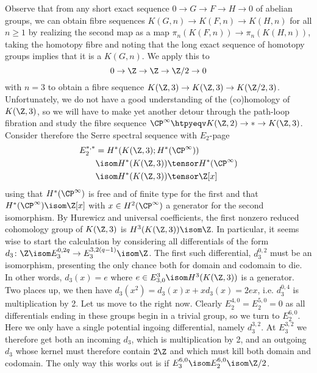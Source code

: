 \begin{solution}
	Observe that from any short exact sequence $0 \to G \to F \to H \to 0$ of abelian groups, we can obtain fibre sequences $K(G, n) \to K(F, n) \to K(H, n)$ for all $n \geq 1$ by realizing the second map as a map $\pi_n(K(F, n)) \to \pi_n(K(H, n))$, taking the homotopy fibre and noting that the long exact sequence of homotopy groups implies that it is a $K(G, n)$.
	We apply this to 
	\begin{equation*}
		0 \to \Z \to \Z \to \Zn{2} \to 0
	\end{equation*}
	with $n = 3$ to obtain a fibre sequence $K(\Z, 3) \to K(\Z, 3) \to K(\Zn{2}, 3)$.
	Unfortunately, we do not have a good understanding of the (co)homology of $K(\Z, 3)$, so we will have to make yet another detour through the path-loop fibration and study the fibre sequence $\CP^\infty \htpyeqv K(\Z, 2) \to * \to K(\Z, 3)$.
	Consider therefore the Serre spectral sequence with $E_2$-page
	\begin{align*}
		E_2^{*, *} &= H^*(K(\Z, 3); H^*(\CP^\infty)) \\ 
				   &\isom H^*(K(\Z, 3)) \tensor H^*(\CP^\infty) \\
				   &\isom H^*(K(\Z, 3)) \tensor \Z[x]
	\end{align*}
	using that $H^*(\CP^\infty)$ is free and of finite type for the first and that $H^*(\CP^\infty) \isom \Z[x]$ with $x \in H^2(\CP^\infty)$ a generator for the second isomorphism.
	By Hurewicz and universal coefficients, the first nonzero reduced cohomology group of $K(\Z, 3)$ is $H^3(K(\Z, 3)) \isom \Z$.
	In particular, it seems wise to start the calculation by considering all differentials of the form $d_3\colon \Z \isom E_3^{0, 2q} \to E_3^{3, 2(q - 1)} \isom \Z$.
	The first such differential, $d_3^{0, 2}$ must be an isomorphism, presenting the only chance both for domain and codomain to die.
	In other words, $d_3(x) = e$ where $e \in E^3_{3, 0} \isom H^3(K(\Z, 3))$ is a generator.
	Two places up, we then have $d_3(x^2) = d_3(x) x + x d_3(x) = 2 e x$, i.e. $d_3^{0, 4}$ is multiplication by 2.
	Let us move to the right now.
	Clearly $E_2^{4, 0} = E_2^{5, 0} = 0$ as all differentials ending in these groups begin in a trivial group, so we turn to $E_2^{6, 0}$.
	Here we only have a single potential ingoing differential, namely $d_3^{3, 2}$.
	At $E_3^{3, 2}$ we therefore get both an incoming $d_3$, which is multiplication by 2, and an outgoing $d_3$ whose kernel must therefore contain $2\Z$ and which must kill both domain and codomain.
	The only way this works out is if $E_3^{6, 0} \isom E_2^{6, 0} \isom \Zn{2}$.


\end{solution}
